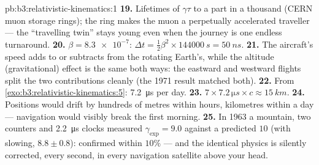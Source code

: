 \begin{solution}{pb:b3:relativistic-kinematics:1}
\textbf{19.} Lifetimes of $\gamma\tau$ to a part in a thousand
(CERN muon storage rings); the ring makes the muon a perpetually
accelerated traveller --- the ``travelling twin'' stays young even
when the journey is one endless turnaround.
\textbf{20.} $\beta = \num{8.3e-7}$: $\Delta t = \tfrac12\beta^2
\times \qty{144000}{s} = \qty{50}{ns}$.
\textbf{21.} The aircraft's speed adds to or subtracts from the
rotating Earth's, while the altitude (gravitational) effect is the
same both ways: the eastward and westward flights split the two
contributions cleanly (the 1971 result matched both).
\textbf{22.} From \cref{exo:b3:relativistic-kinematics:5}:
\qty{7.2}{\micro s} per day.
\textbf{23.} $7 \times 7.2\,\unit{\micro s} \times c \approx
\qty{15}{km}.$
\textbf{24.} Positions would drift by hundreds of metres within
hours, kilometres within a day --- navigation would visibly break the
first morning.
\textbf{25.} In 1963 a mountain, two counters and \qty{2.2}{\micro s}
clocks measured $\gamma_{\exp} = 9.0$ against a predicted $10$ (with
slowing, $8.8 \pm 0.8$):  confirmed within $10\%$ ---
and the identical physics is silently corrected, every second, in
every navigation satellite above your head.
\end{solution}

